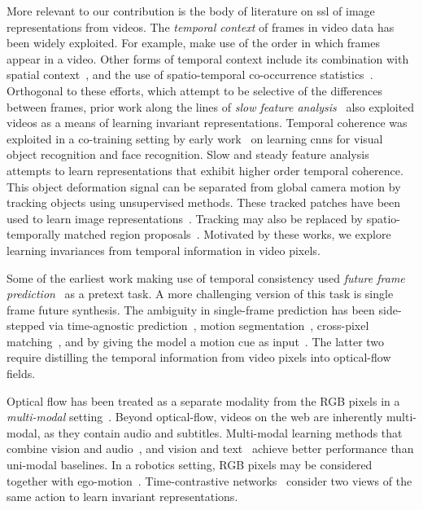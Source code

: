 \documentclass[10pt,twocolumn,letterpaper]{article}
\renewcommand{\paragraph}[1]{\noindent{\bf #1}\quad}
\begin{document}
\paragraph{Learning image representations from videos} More relevant to our contribution is the body of literature on \gls{ssl} of image representations from videos. The \emph{temporal context} of frames in video data has been widely exploited.
For example, \cite{misra2016shuffle,lee2017unsupervised,fernando2017self,buchler2018improving,wei2018learning} make use of the order in which frames appear in a video. Other forms of temporal context include its combination with spatial context~\cite{wang2017transitive}, and the use of spatio-temporal co-occurrence statistics~\cite{isola2015learning}. Orthogonal to these efforts, which attempt to be selective of the differences between frames, prior work along the lines of \emph{slow feature analysis}~\cite{wiskott2002slow,zou2011unsupervised} also exploited videos as a means of learning invariant representations. Temporal coherence was exploited in a co-training setting by early work~\cite{mobahi2009deep} on learning \glspl{cnn} for visual object recognition and face recognition. Slow and steady feature analysis~\cite{jayaraman2016slow} attempts to learn representations that exhibit higher order temporal coherence. This object deformation signal can be separated from global camera motion by tracking objects using unsupervised methods. These tracked patches have been used to learn image representations~\cite{wang2015unsupervised}. Tracking may also be replaced by spatio-temporally matched region proposals~\cite{gao2016object}. Motivated by these works, we explore learning invariances from temporal information in video pixels.

Some of the earliest work making use of temporal consistency used \emph{future frame prediction}~\cite{srivastava2015unsupervised} as a pretext task. A more challenging version of this task is single frame future synthesis. The ambiguity in single-frame prediction has been side-stepped via time-agnostic prediction~\cite{jayaraman2019time}, motion segmentation~\cite{pathak2017learning}, cross-pixel matching~\cite{mahendran2018cross}, and by giving the model a motion cue as input~\cite{zhan2019self}. The latter two require distilling the temporal information from video pixels into optical-flow fields. 

Optical flow has been treated as a separate modality from the RGB pixels in a \emph{multi-modal} setting~\cite{sayed2018cross,tian2019contrastive}. Beyond optical-flow, videos on the web are inherently multi-modal, as they contain audio and subtitles. Multi-modal learning methods that combine vision and audio~\cite{ngiam2011multimodal,de1994learning,owens2016ambient,arandjelovic2017look}, and vision and text~\cite{sun2019videobert} achieve better performance than uni-modal baselines. In a robotics setting, RGB pixels may be considered together with ego-motion~\cite{agrawal2015learning,jayaraman2017learning}. Time-contrastive networks~\cite{sermanet2018time} consider two views of the same action to learn invariant representations. 
\end{document}
